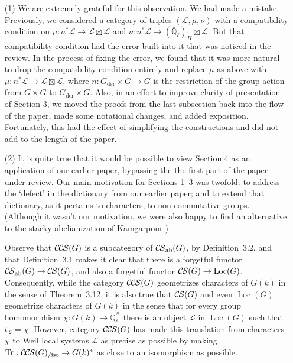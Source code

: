 \documentclass[letter,10pt]{amsart}
\theoremstyle{plain}
\theoremstyle{definition}
\newcommand{\EE}{\mathbb{\bar Q}_\ell}
\newcommand{\Fq}{k}
\newcommand{\EEx}{\EE^\times}
\DeclareMathOperator{\Loc}{Loc}
\newcommand{\der}{_{\operatorname{der}}}
\newcommand{\ab}{_{\operatorname{ab}}}
\newcommand{\trFrob}[1]{t_{#1}}
\DeclareMathOperator{\Tr}{Tr}
\newcommand{\TrFrob}[1]{\Tr_{#1}}
\newcommand{\cs}[1]{{\mathcal{#1}}}
\newcommand{\CS}{{\mathcal{C\hskip-0.8pt S}}}
\newcommand{\CCS}{{\mathcal{C\hskip-.8pt C\hskip-0.8pt S}}}
\newcommand{\CCSiso}[1]{\CCS(#1)_{/\text{iso}}}
\begin{document}
\begin{enumerate}
\item[(1)] We are extremely grateful for this observation. We had made a mistake. Previously, we considered a category of triples $(\cs{L},\mu,\nu)$ with a compatibility condition on $\mu : a^*\cs{L} \to \cs{L}\boxtimes\cs{L}$ and $\nu : n^* \cs{L}\to (\EE)_{H}\boxtimes \cs{L}$. But that compatibility condition had the error built into it that was noticed in the review. In the process of fixing the error, we found that it was more natural to drop the compatibility condition entirely and replace $\mu$ as above with $\mu : n^*\cs{L} \to \cs{L}\boxtimes\cs{L}$, where $n: G\der\times G\to G$ is the restriction of the group action from $G\times G$ to $G\der\times G$. Also, in an effort to improve clarity of presentation of Section 3, we moved the proofs from the last subsection back into the flow of the paper, made some notational changes, and added exposition.
Fortunately, this had the effect of simplifying the constructions and did not add to the length of the paper. 
\item[(2)] It is quite true that it would be possible to view Section 4 as an application of our earlier paper, bypassing the the first part of the paper under review. Our main motivation for Sections 1--3 was twofold: to address the `defect' in the dictionary from our earlier paper; and to extend that dictionary, as it pertains to characters, to non-commutative groups. (Although it wasn't our motivation, we were also happy to find an alternative to the stacky abelianization of Kamgarpour.) 

Observe that $\CCS(G)$ is a subcategory of $\CS\ab(G)$, by Definition~3.2, and that Definition~3.1 makes it clear that there is a forgetful functor $\CS\ab(G) \to \CS(G)$, and also a forgetful functor $\CS(G)\to \Loc(G)$.
Consequently, while the category $\CCS(G)$ geometrizes characters of $G(\Fq)$ in the sense of Theorem~3.12, it is also true that $\CS(G)$ and even $\Loc(G)$
geometrize characters of $G(\Fq)$ in the sense that for every group homomorphism $\chi : G(\Fq) \to \EEx$ there is an object $\cs{L}$ in $\Loc(G)$ such that $\trFrob{\cs{L}} = \chi$.
However, category $\CCS(G)$ has made this translation from characters $\chi$ to Weil local systems $\cs{L}$ as precise as possible by making $\TrFrob{} : \CCSiso{G} \to G(k)^*$ as close to an isomorphism as possible.
\end{enumerate}
\end{document}
